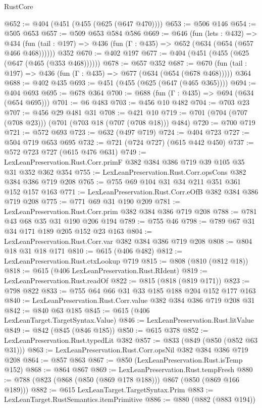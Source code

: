 \begin{lexlean}{RustCore}
\begin{coremodule}
@652 := @404 (@451 (@455 (@625 (@647 @470))))
@653 := @506 @146
@654 := @505 @653
@657 := @509 @653 @584 @586
@669 := @646
    (fun (lets : @432) =>
    @434 (fun (tail : @197) => @436 (fun (Γ : @435) => @652 (@634 (@654 (@657 @466 @468))))))
    @352
@670 := @402 @197
@677 := @404 (@451 (@455 (@625 (@647 (@465 (@353 @468))))))
@678 := @657 @352
@687 := @670 (fun (tail : @197) => @436 (fun (Γ : @435) => @677 (@634 (@654 (@678 @468))))) @364
@688 := @402 @435
@693 := @451 (@455 (@625 (@647 (@465 @365))))
@694 := @404 @693
@695 := @678 @364
@700 := @688 (fun (Γ : @435) => @694 (@634 (@654 @695)))
@701 := @6 @483
@703 := @456 @10 @482
@704 := @703 @23
@707 := @456 @29 @481 @31
@708 := @421 @10
@719 := @701 (@704 (@707 (@708 @23))) (@701 (@703 @18 (@707 (@708 @18))) @484)
@720 := @700 @719
@721 := @572 @693
@723 := @632 (@497 @719)
@724 := @404 @723
@727 := @504 @719 @653 @695
@732 := @721 (@724 @727) (@615 @442 @450)
@737 := @572 @723 @727 (@615 @476 @631)
@749 := LexLeanPreservation.Rust.Corr.primF @382 @384 @386 @719 @39 @105 @35 @31 @352 @362 @354
@755 := LexLeanPreservation.Rust.Corr.opsCons @382 @384 @386 @719 @208
@765 := @755 @69 @104 @31 @34 @211 @351 @361 @152 @157 @163
@771 := LexLeanPreservation.Rust.Corr.eOfB @382 @384 @386 @719 @208
@775 := @771 @69 @31 @190 @209
@781 := LexLeanPreservation.Rust.Corr.prim @382 @384 @386 @719 @208
@788 := @781 @43 @68 @35 @31 @190 @206 @194
@789 := @755 @46
@798 := @789 @67 @31 @34 @171 @189 @205 @152 @23 @163
@804 := LexLeanPreservation.Rust.Corr.var @382 @384 @386 @719 @208
@808 := @804 @18 @31 @18 @171
@810 := @615 (@406 @482)
@812 := LexLeanPreservation.Rust.ctxLookup @719
@815 := @808 (@810 (@812 @18))
@818 := @615 (@406 LexLeanPreservation.Rust.RIdent)
@819 := LexLeanPreservation.Rust.readOf
@822 := @815 (@818 (@819 @171))
@823 := @798 @822
@833 := @755 @64 @66 @31 @33 @185 @188 @204 @152 @177 @163
@840 := LexLeanPreservation.Rust.Corr.value @382 @384 @386 @719 @208 @31
@842 := @840 @63 @185
@845 := @615 (@406 LexLeanTarget.TargetSyntax.Value)
@846 := LexLeanPreservation.Rust.litValue
@849 := @842 (@845 (@846 @185))
@850 := @615 @378
@852 := LexLeanPreservation.Rust.typedLit @382
@857 := @833 (@849 (@850 (@852 @63 @31)))
@863 := LexLeanPreservation.Rust.Corr.opsNil @382 @384 @386 @719 @208
@864 := @857 @863
@867 := @850 (LexLeanPreservation.Rust.isTemp @152)
@868 := @864 @867
@869 := LexLeanPreservation.Rust.tempFresh
@880 := @788 (@823 (@868 (@850 (@869 @178 @188))) @867 (@850 (@869 @166 @189)))
@882 := @615 LexLeanTarget.TargetSyntax.Prim
@883 := LexLeanTarget.RustSemantics.itemPrimitive
@886 := @880 (@882 (@883 @194))

\end{coremodule}
\end{lexlean}
